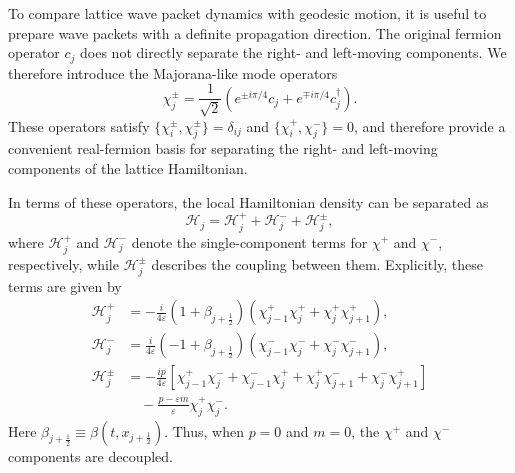 \documentclass[reprint,amsmath,amssymb,aps,prb]{revtex4-2}
\begin{document}
To compare lattice wave packet dynamics with geodesic motion, it is useful to prepare wave packets with a definite propagation direction. The original fermion operator $c_j$ does not directly separate the right- and left-moving components. We therefore introduce the Majorana-like mode operators
\begin{equation}
\chi_j^\pm =
\frac{1}{\sqrt{2}}
\left(
e^{\pm i\pi/4} c_j
+
e^{\mp i\pi/4} c_j^\dagger
\right).
\label{eq:chi_pm_def}
\end{equation}
These operators satisfy $\{\chi_i^\pm,\chi_j^\pm\}=\delta_{ij}$ and $\{\chi_i^+,\chi_j^-\}=0$, and therefore provide a convenient real-fermion basis for separating the right- and left-moving components of the lattice Hamiltonian.

In terms of these operators, the local Hamiltonian density can be separated as
\begin{equation}
\mathcal{H}_j = \mathcal{H}_j^+ + \mathcal{H}_j^- + \mathcal{H}_j^\pm ,
\label{eq:H_decomposition}
\end{equation}
where $\mathcal{H}_j^+$ and $\mathcal{H}_j^-$ denote the single-component terms for $\chi^+$ and $\chi^-$, respectively, while $\mathcal{H}_j^\pm$ describes the coupling between them. Explicitly, these terms are given by
\begin{align}
\mathcal{H}_j^+
&=
-\frac{i}{4\varepsilon}
(1+\beta_{j+\frac{1}{2}})
\left(
\chi_{j-1}^+\chi_j^+
+
\chi_j^+\chi_{j+1}^+
\right),
\label{eq:H_plus}
\\
\mathcal{H}_j^-
&=
\frac{i}{4\varepsilon}
(-1+\beta_{j+\frac{1}{2}})
\left(
\chi_{j-1}^-\chi_j^-
+
\chi_j^-\chi_{j+1}^-
\right),
\label{eq:H_minus}
\\
\mathcal{H}_j^\pm
&=
-\frac{i p}{4\varepsilon}
\left[
\chi_{j-1}^+\chi_j^-
+
\chi_{j-1}^-\chi_j^+
+
\chi_j^+\chi_{j+1}^-
+
\chi_j^-\chi_{j+1}^+
\right]
\nonumber\\
&\quad
-
\frac{p-\varepsilon m}{\varepsilon}
\chi_j^+\chi_j^-.
\label{eq:H_pm}
\end{align}
Here $\beta_{j+\frac{1}{2}}\equiv\beta(t,x_{j+\frac{1}{2}})$.
Thus, when $p=0$ and $m=0$, the $\chi^+$ and $\chi^-$ components are decoupled.
\end{document}
